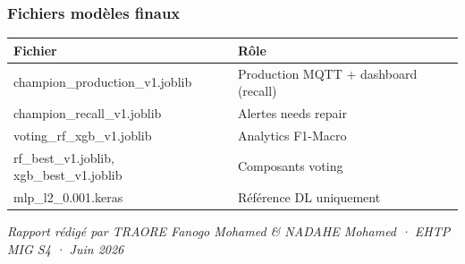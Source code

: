 \documentclass[11pt,a4paper]{report}
\begin{document}
\subsubsection{Fichiers modèles finaux}



\begin{longtable}{@{}ll@{}}
\toprule
Fichier & Rôle \\
\midrule
champion\_production\_v1.joblib & Production MQTT + dashboard (recall) \\
champion\_recall\_v1.joblib & Alertes needs repair \\
voting\_rf\_xgb\_v1.joblib & Analytics F1-Macro \\
rf\_best\_v1.joblib, xgb\_best\_v1.joblib & Composants voting \\
mlp\_l2\_0.001.keras & Référence DL uniquement \\
\bottomrule
\end{longtable}






\textit{Rapport rédigé par TRAORE Fanogo Mohamed \& NADAHE Mohamed · EHTP MIG S4 · Juin 2026}
\end{document}
